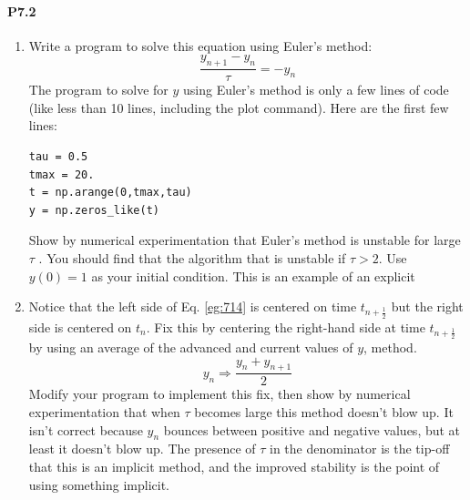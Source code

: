 \documentclass{book}
\theoremstyle{plain}
\theoremstyle{definition}
\numberwithin{exm}{chapter}
\theoremstyle{remark}
\theoremstyle{summary}
\theoremstyle{overview}
\begin{document}
\paragraph*{P7.2}
\begin{enumerate}[label=(\alph*)]
\item Write a program to solve this equation using Euler\rq s method:
\begin{equation}\label{eq:714}
\frac{y_{n+1}-y_n}{\tau} = -y_n
\end{equation}
The program to solve for $y$ using Euler\rq s method is only a few lines of
code (like less than 10 lines, including the plot command). Here are
the first few lines:
\begin{lstlisting}
tau = 0.5
tmax = 20.
t = np.arange(0,tmax,tau)
y = np.zeros_like(t)
\end{lstlisting}
Show by numerical experimentation that Euler\rq s method is unstable
for large $\tau$ . You should find that the algorithm that is unstable if $\tau > 2$.
Use $y(0) = 1$ as your initial condition. This is an example of an explicit
\item Notice that the left side of Eq. \eqref{eg:714} is centered on time $t_{n+\frac{1}{2}}$ but the
right side is centered on $t_n$. Fix this by centering the right-hand side at time $t_{n+\frac{1}{2}}$ by using an average of the advanced and current values of $y$, method.
\begin{equation*}
y_{n} \Rightarrow \frac{y_{n}+y_{n+1}}{2}
\end{equation*}
Modify your program to implement this fix, then show by numerical
experimentation that when $\tau$ becomes large this method doesn\rq t blow
up. It isn\rq t correct because $y_n$ bounces between positive and negative
values, but at least it doesn\rq t blow up. The presence of $\tau$ in the denominator is the tip-off that this is an implicit method, and the improved
stability is the point of using something implicit.


\end{enumerate}
\end{document}

